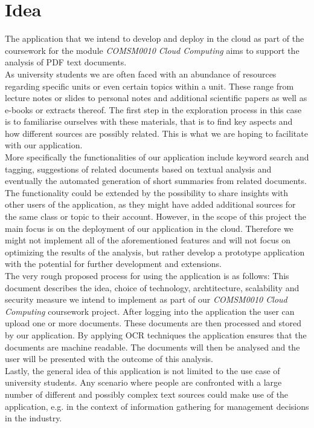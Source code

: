 \documentclass[conference]{IEEEtran}
\begin{document}
\section{Idea}
The application that we intend to develop and deploy in the cloud as part of the coursework for the module 
\textit{COMSM0010 Cloud Computing} aims to support the analysis of PDF text documents. \\
As university students we are often faced with an abundance of resources regarding specific units or even
certain topics within a unit. These range from lecture notes or slides to personal notes and additional
scientific papers as well as e-books or extracts thereof. The first step in the exploration process in this
case is to familiarise ourselves with these materials, that is to find key aspects and how different sources
are possibly related. This is what we are hoping to facilitate with our application. \\
More specifically the functionalities of our application include keyword search and tagging, suggestions of
related documents based on textual analysis and eventually the automated generation of short summaries from
related documents. The functionality could be extended by the possibility to share insights with other users
of the application, as they might have added additional sources for the same class or topic to their account.
However, in the scope of this project the main focus is on the deployment of our application in the cloud.
Therefore we might not implement all of the aforementioned features and will not focus on optimizing the 
results of the analysis, but rather develop a prototype application with the potential for further 
development and extensions. \\
The very rough proposed process for using the application is as follows: This document describes the
idea, choice of technology, archtitecture, scalability and security measure we intend to implement as
part of our \textit{COMSM0010 Cloud Computing} coursework project. After logging into the application the user can
upload one or more documents. These documents are then processed and stored by our application. By applying
OCR techniques the application ensures that the documents are machine readable. The documents will then
be analysed and the user will be presented with the outcome of this analysis. \\
Lastly, the general idea of this application is not limited to the use case of university students.
Any scenario where people are confronted with a large number of different and possibly complex text
sources could make use of the application, e.g. in the context of information gathering for management
decisions in the industry.
\end{document}
